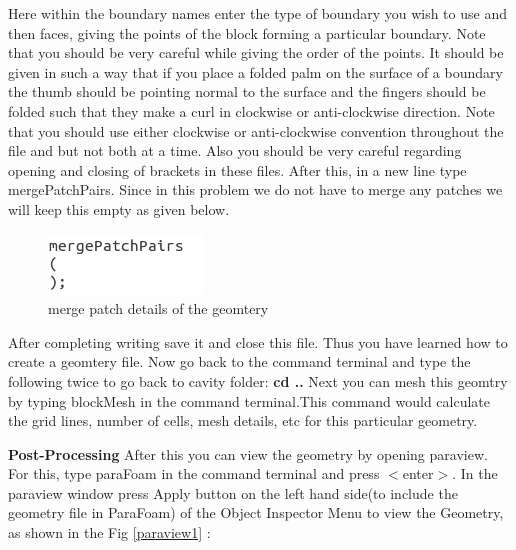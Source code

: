 \documentclass[a4paper,12pt]{report}
\begin{document}
\flushleft Here within the boundary names enter the type of boundary you wish to use and  then faces, giving the points of the block forming a particular boundary. Note that you should be very careful while giving the order of the points. It should be given in such a way that if you place a folded palm on the surface of a boundary the thumb should be pointing normal to the surface and the fingers should be folded such that they make a curl in clockwise or anti-clockwise direction. Note that you should use either clockwise or anti-clockwise convention throughout the file and but not both at a time. Also you should be very careful regarding opening and closing of brackets in these files.
\flushleft After this, in a new line type mergePatchPairs. Since in this problem we do not have to merge any patches we will keep this empty as given below.

\begin{figure}[ht]  
\begin{center}  
\includegraphics[scale=0.66]{merge.png}
\caption{merge patch details of the geomtery}
\label{merge}
\end{center}  
\end{figure}

\flushleft After completing writing  save it and close this file. Thus you have learned how to create a geomtery file.
\flushleft Now go back to the command terminal and type the following twice to go back to cavity folder:
\center \textbf{cd ..} 
\flushleft Next you can mesh this geomtry by typing blockMesh in the command terminal.This command would calculate the grid lines, number of cells, mesh details, etc for this particular geometry.

\flushleft\textbf{Post-Processing}
\flushleft  After this you can view the geometry by opening paraview. For this, type paraFoam in the command terminal and press $<$enter$>$.
\flushleft In the paraview window press Apply button on the left hand side(to include the geometry file in ParaFoam) of the Object Inspector Menu to view the Geometry, as shown in the Fig \ref{paraview1} $:$
\end{document}
